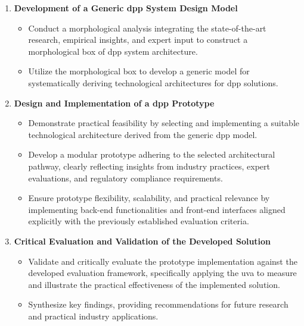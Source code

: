 \begin{enumerate}[label=\textbf{O\arabic*}, itemsep=\baselineskip]
    \item \textbf{Development of a Generic \ac{dpp} System Design Model}
    \begin{itemize}
        \item Conduct a morphological analysis integrating the state-of-the-art research, empirical insights, and expert input to construct a morphological box of \ac{dpp} system architecture.
        \item Utilize the morphological box to develop a generic model for systematically deriving technological architectures for \ac{dpp} solutions.
    \end{itemize}

    \item \textbf{Design and Implementation of a \ac{dpp} Prototype}
    \begin{itemize}
        \item Demonstrate practical feasibility by selecting and implementing a suitable technological architecture derived from the generic \ac{dpp} model.
        \item Develop a modular prototype adhering to the selected architectural pathway, clearly reflecting insights from industry practices, expert evaluations, and regulatory compliance requirements.
        \item Ensure prototype flexibility, scalability, and practical relevance by implementing back-end functionalities and front-end interfaces aligned explicitly with the previously established evaluation criteria.
    \end{itemize}

    \item \textbf{Critical Evaluation and Validation of the Developed Solution}
    \begin{itemize}
        \item Validate and critically evaluate the prototype implementation against the developed evaluation framework, specifically applying the \ac{uva} to measure and illustrate the practical effectiveness of the implemented solution.
        \item Synthesize key findings, providing recommendations for future research and practical industry applications.
    \end{itemize}
\end{enumerate}

